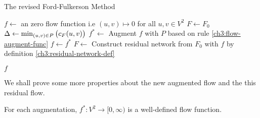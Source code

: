 \begin{algorithm}[H]
    \caption{The revised Ford-Fulkerson Method}
    \label{ch3:ford-fulkerson}

    \begin{algorithmic}[1]
        \State $f\gets$ an zero flow function \Comment i.e $(u,v)\mapsto 0$ for all $u,v\in V^2$
        \State $F\gets F_0$
        \State $\Delta\gets \min_{(u,v)\in P} \del{c_{F}(u,v)}$ 
        \State $f^* \gets $ Augment $f$ with $P$ based on rule \ref{ch3:flow-augment-func}
        \State  $f\gets f^*$
        \State $F \gets $ Construct residual network from $F_0$ with $f$ by definition \ref{ch3:residual-network-def} 
        \EndWhile

        \State \Return $f$ 
        \EndProcedure
    \end{algorithmic}
\end{algorithm}

We shall prove some more properties about the new augmented flow and the this residual flow. 

\begin{theorem}
    For each augmentation, $f^*: V^2\to[0,\infty)$ is a well-defined flow function. 
\end{theorem}

